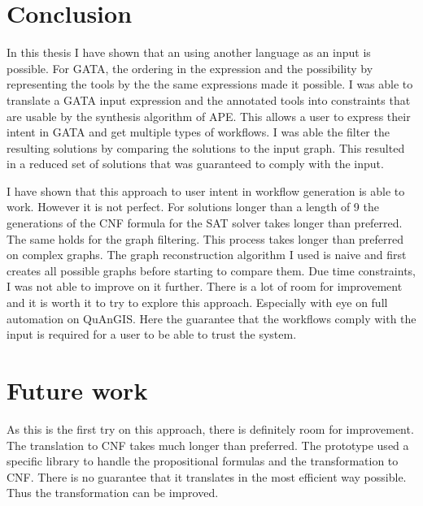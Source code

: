 \documentclass{article}
\begin{document}



\section{Conclusion}

In this thesis I have shown that an using another language as an input is possible. For GATA, the ordering in the expression and the possibility by representing the tools by the the same expressions made it possible. I was able to translate a GATA input expression and the annotated tools into constraints that are usable by the synthesis algorithm of APE. This allows a user to express their intent in GATA and get multiple types of workflows. I was able the filter the resulting solutions by comparing the solutions to the input graph. This resulted in a reduced set of solutions that was guaranteed to comply with the input. 

I have shown that this approach to user intent in workflow generation is able to work. However it is not perfect. For solutions longer than a length of 9 the generations of the CNF formula for the SAT solver takes longer than preferred. The same holds for the graph filtering. This process takes longer than preferred on complex graphs. The graph reconstruction algorithm I used is naive and first creates all possible graphs before starting to compare them. Due time constraints, I was not able to improve on it further. There is a lot of room for improvement and it is worth it to try to explore this approach. Especially with eye on full automation on QuAnGIS. Here the guarantee that the workflows comply with the input is required for a user to be able to trust the system. 





\section{Future work}

As this is the first try on this approach, there is definitely room for improvement. The translation to CNF takes much longer than preferred. The prototype used a specific library to handle the propositional formulas and the transformation to CNF. There is no guarantee that it translates in the most efficient way possible. Thus the transformation can be improved. 
\end{document}
